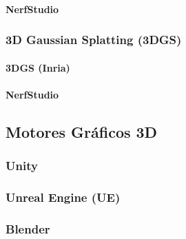 \documentclass[a4paper, 12pt, spanish, twoside]{article}
\begin{document}
\paragraph{NerfStudio} \label{sec:herramientas:radfi:nerf:nerfstudio}


\subsubsection{3D Gaussian Splatting (3DGS)} \label{sec:herramientas:radfi:3dgs}

\paragraph{3DGS (Inria)} \label{sec:herramientas:radfi:3dgs:inria}

\paragraph{NerfStudio} \label{sec:herramientas:radfi:3dgs:nerfstudio}



\subsection{Motores Gráficos 3D} \label{sec:herramientas:motoresgraficos3d}

\subsubsection{Unity} \label{sec:herramientas:motoresgraficos3d:unity}


\subsubsection{Unreal Engine (UE)} \label{sec:herramientas:motoresgraficos3d:ue}


\subsubsection{Blender} \label{sec:herramientas:motoresgraficos3d:blender}
\end{document}
